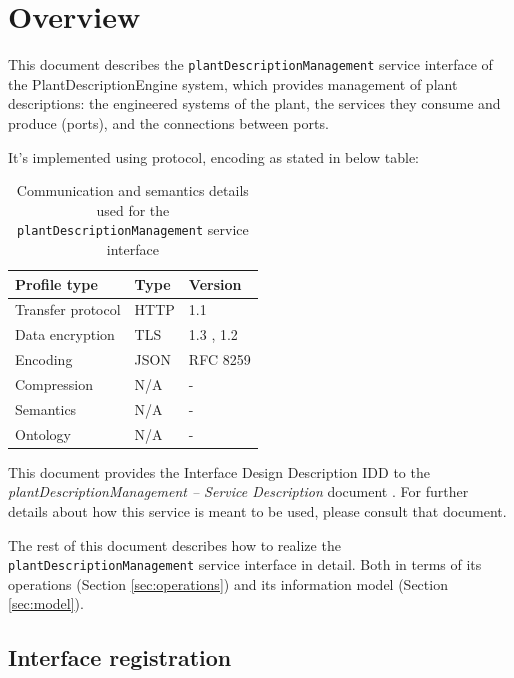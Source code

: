 \documentclass[a4paper]{arrowhead}
\begin{document}
\section{Overview}
\label{sec:overview}

This document describes the \texttt{plant\allowbreak{}Description\allowbreak{}Management} service interface of the PlantDescriptionEngine system, which provides management of plant descriptions: the engineered systems of the plant, the services they consume and produce (ports), and the connections between ports.

It's implemented using protocol, encoding as stated in below table:
\begin{table}[ht!]
  \centering
  \begin{tabular}{|l|l|l|}
    \hline
    \rowcolor{gray!33} Profile type & Type & Version \\ \hline
    Transfer protocol & HTTP & 1.1 \cite{rfc9112} \\ \hline
    Data encryption & TLS & 1.3 \cite{rfc8446}, 1.2 \cite{rfc5246} \\ \hline
    Encoding & JSON & RFC 8259 \cite{rfc8259} \\ \hline
    Compression & N/A & - \\ \hline
    Semantics & N/A & - \\ \hline
    Ontology & N/A & - \\ \hline
  \end{tabular}
  \caption{Communication and semantics details used for the \texttt{plant\allowbreak{}Description\allowbreak{}Management} service interface}
  \label{tab:comunication_semantics_profile}
\end{table}

This document provides the Interface Design Description IDD to the \textit{plantDescriptionManagement -- Service Description} document \cite{pde-plantDescriptionManagement-sd}.
For further details about how this service is meant to be used, please consult that document.

The rest of this document describes how to realize the \texttt{plant\allowbreak{}Description\allowbreak{}Management} service
interface in detail. Both in terms of its operations (Section \ref{sec:operations}) and its information model (Section \ref{sec:model}).

\subsection{Interface registration}
\end{document}
